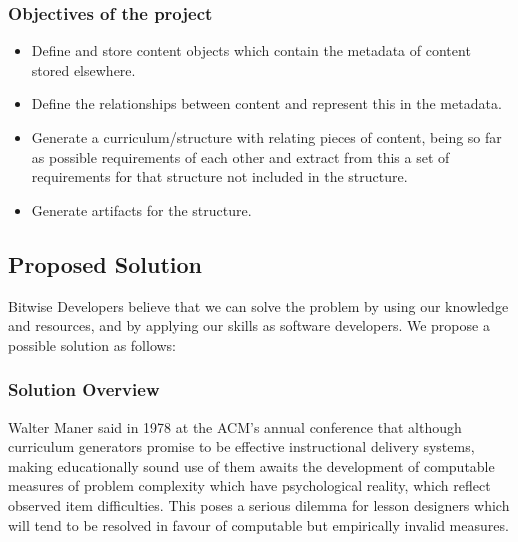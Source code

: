 \documentclass[a4paper]{article}
\begin{document}
			\subsubsection{Objectives of the project}

				\begin{itemize}

					\item Define and store content objects which contain the metadata of content stored elsewhere.

					\item Define the relationships between content and represent this in the metadata.

					\item Generate a curriculum/structure with relating pieces of content, being so far as possible requirements of each other and extract from this a set of requirements for that structure not included in the structure.
                    
                    \item Generate artifacts for the structure.

				\end{itemize}

		\subsection{Proposed Solution}

Bitwise Developers believe that we can solve the problem by using our knowledge and resources, and by applying our skills as software developers. We propose a possible solution as follows:

			\subsubsection{Solution Overview}
Walter Maner said in 1978 at the ACM's annual conference that although curriculum generators promise to be effective instructional delivery systems, making educationally sound use of them awaits the development of computable measures of problem complexity which have psychological reality, which reflect observed item difficulties. This poses a serious dilemma for lesson designers which will tend to be resolved in favour of computable but empirically invalid measures.
\end{document}
